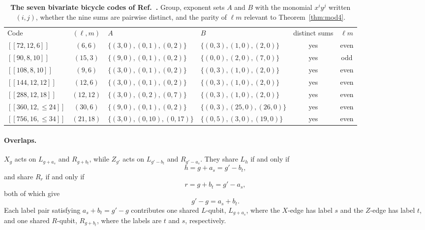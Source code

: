 \documentclass[reprint,twocolumn,superscriptaddress,nofootinbib]{revtex4-2}
\theoremstyle{plain}
\begin{document}
\begin{table}[!t]
\caption{\textbf{The seven bivariate bicycle codes of
Ref.~\cite{Bravyi2024}.} Group, exponent sets $A$ and $B$ with the monomial
$x^iy^j$ written $(i,j)$, whether the nine sums are pairwise distinct, and
the parity of $\ell m$ relevant to Theorem~\ref{thm:mod4}.}
\label{tab:instances}
\begin{ruledtabular}
\begin{tabular}{lcllcc}
Code & $(\ell,m)$ & $A$ & $B$ & distinct sums & $\ell m$ \\
\colrule
$[[72,12,6]]$
  & $(6,6)$
  & $\{(3,0),(0,1),(0,2)\}$
  & $\{(0,3),(1,0),(2,0)\}$
  & yes & even \\
$[[90,8,10]]$
  & $(15,3)$
  & $\{(9,0),(0,1),(0,2)\}$
  & $\{(0,0),(2,0),(7,0)\}$
  & yes & odd \\
$[[108,8,10]]$
  & $(9,6)$
  & $\{(3,0),(0,1),(0,2)\}$
  & $\{(0,3),(1,0),(2,0)\}$
  & yes & even \\
$[[144,12,12]]$
  & $(12,6)$
  & $\{(3,0),(0,1),(0,2)\}$
  & $\{(0,3),(1,0),(2,0)\}$
  & yes & even \\
$[[288,12,18]]$
  & $(12,12)$
  & $\{(3,0),(0,2),(0,7)\}$
  & $\{(0,3),(1,0),(2,0)\}$
  & yes & even \\
$[[360,12,\le24]]$
  & $(30,6)$
  & $\{(9,0),(0,1),(0,2)\}$
  & $\{(0,3),(25,0),(26,0)\}$
  & yes & even \\
$[[756,16,\le34]]$
  & $(21,18)$
  & $\{(3,0),(0,10),(0,17)\}$
  & $\{(0,5),(3,0),(19,0)\}$
  & yes & even \\
\end{tabular}
\end{ruledtabular}
\end{table}

\paragraph*{Overlaps.}
$X_g$ acts on $L_{g+a_s}$ and $R_{g+b_t}$, while $Z_{g'}$ acts on
$L_{g'-b_t}$ and $R_{g'-a_s}$. They share $L_h$ if and only if
\[
h=g+a_s=g'-b_t,
\]
and share $R_r$ if and only if
\[
r=g+b_t=g'-a_s,
\]
both of which give
\[
g'-g=a_s+b_t.
\]
Each label pair satisfying $a_s+b_t=g'-g$ contributes one shared
$L$-qubit, $L_{g+a_s}$, where the $X$-edge has label $s$ and the
$Z$-edge has label $t$, and one shared $R$-qubit, $R_{g+b_t}$, where the
labels are $t$ and $s$, respectively.
\end{document}
